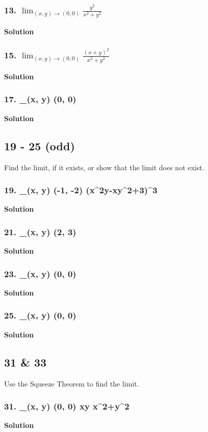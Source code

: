 \documentclass{article}
\newcommand{\limit}[4]{\lim_{(#1, #2) \to (#3, #4)}}
\begin{document}
\subsubsection*{13. $\limit x y 0 0 \displaystyle\frac {y^2}{x^2 + y^2}$}
\centerline{\textbf{Solution}}
\subsubsection*{15. $\limit x y 0 0 \displaystyle\frac {(x+y)^2}{x^2 + y^2}$}
\centerline{\textbf{Solution}}
\subsubsection*{17. \limit x y 0 0 \displaystyle{}}
\centerline{\textbf{Solution}}
\subsection*{19 - 25 (odd)}
Find the limit, if it exists, or show that the limit does not exist.
\subsubsection*{19. \limit x y {-1} {-2} (x^2y-xy^2+3)^3}
\centerline{\textbf{Solution}}
\subsubsection*{21. \limit x y 2 3 \displaystyle{}}
\centerline{\textbf{Solution}}
\subsubsection*{23. \limit x y 0 0 \displaystyle{}}
\centerline{\textbf{Solution}}
\subsubsection*{25. \limit x y 0 0 \displaystyle{}}
\centerline{\textbf{Solution}}
\subsection*{31 \& 33}
Use the Squeeze Theorem to find the limit.
\subsubsection*{31. \limit x y 0 0 xy\sin \displaystyle{} {x^2+y^2}}
\centerline{\textbf{Solution}}
\end{document}

